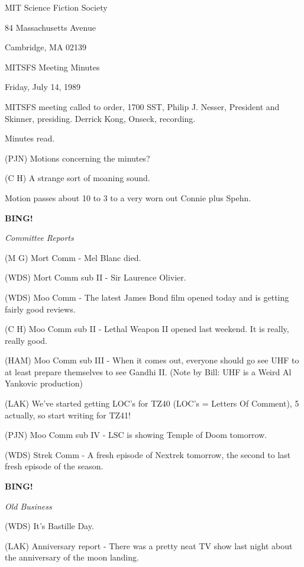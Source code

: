 \documentclass[12pt]{article}
\newcommand{\bing}{{\bf BING!} }
\newcommand{\goto}[1]{\bing \vskip 12pt \centerline{{\em{#1}}}}
\begin{document}
\begin{center}

MIT Science Fiction Society 

84 Massachusetts Avenue

Cambridge, MA 02139

\vspace{12pt}

MITSFS Meeting Minutes 

Friday, July 14, 1989

\end{center}
 
\vspace{18pt}

\setlength{\parskip}{6pt}

\noindent
MITSFS meeting called to order, 1700 SST, Philip J. Nesser, President and Skinner, presiding. Derrick Kong, Onseck, recording.

Minutes read.

(PJN) Motions concerning the minutes?

(C H) A strange sort of moaning sound.

Motion passes about 10 to 3 to a very worn out Connie plus Spehn.

\goto{Committee Reports}

(M G) Mort Comm - Mel Blanc died.

(WDS) Mort Comm sub II - Sir Laurence Olivier.

(WDS) Moo Comm - The latest James Bond film opened today and is getting fairly good reviews.

(C H) Moo Comm sub II - Lethal Weapon II opened last weekend.  It is really, really good.

(HAM) Moo Comm sub III - When it comes out, everyone should go see UHF to at least prepare themselves to see Gandhi II. (Note by Bill: UHF is a Weird Al Yankovic production)

(LAK) We've started getting LOC's for TZ40 (LOC's = Letters Of Comment), 5 actually, so start writing for TZ41!

(PJN) Moo Comm sub IV - LSC is showing Temple of Doom tomorrow.

(WDS) Strek Comm - A fresh episode of Nextrek tomorrow, the second to last fresh episode of the season.

\goto{Old Business}

(WDS) It's Bastille Day.

(LAK) Anniversary report - There was a pretty neat TV show last night about the anniversary of the moon landing.
\end{document}
